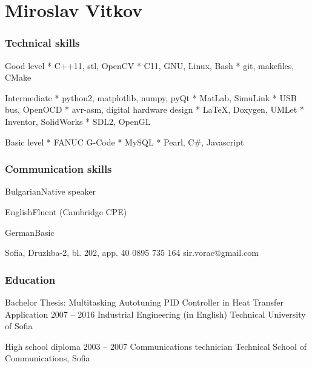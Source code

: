 \documentclass{tccv}
\begin{document}
\part{Miroslav Vitkov}


\section{Technical skills}
\begin{factlist}
\item{Good level}
{
     * C++11, stl, OpenCV                \mynext
     * C11, GNU, Linux, Bash             \mynext
     * git, makefiles, CMake
}

\item{Intermediate}
{
    * python2, matplotlib, numpy, pyQt   \mynext
    * MatLab, SimuLink                   \mynext
    * USB bus, OpenOCD                   \mynext
    * avr-asm, digital hardware design   \mynext
    * LaTeX, Doxygen, UMLet              \mynext
    * Inventor, SolidWorks               \mynext
    * SDL2, OpenGL
}

\item{Basic level}
{
    * FANUC G-Code                       \mynext
    * MySQL                              \mynext
    * Pearl, C\#, Javascript
}
\end{factlist}


\section{Communication skills}
\begin{factlist}
\item{Bulgarian}{Native speaker}
\item{English}{Fluent (Cambridge CPE)}
\item{German}{Basic}
\end{factlist}


\personal
    {Sofia, Druzhba-2, bl. 202, app. 40}
    {0895 735 164}
    {sir.vorac@gmail.com}


\section{Education}
\begin{yearlist}
\item[Bachelor Thesis:                 \newline
     {\footnotesize Multitasking Autotuning PID Controller in Heat Transfer Application}]
     {2007 -- 2016}
     {Industrial Engineering (in English)}
     {Technical University of Sofia}

\item[High school diploma]{2003 -- 2007}
     {Communications technician}
     {Technical School of Communications, Sofia}
\end{yearlist}
\end{document}
